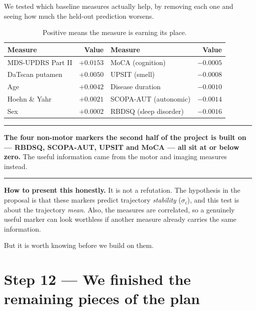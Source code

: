 \documentclass[11pt,a4paper]{article}
\newenvironment{found}
  {\begin{center}\begin{minipage}{0.95\textwidth}%
   \vspace{4pt}\hrule\vspace{6pt}\small}
  {\vspace{6pt}\hrule\vspace{4pt}\end{minipage}\end{center}}
\begin{document}
We tested which baseline measures actually help, by removing each one and seeing
how much the held-out prediction worsens.

\begin{table}[H]
\centering
\small
\begin{tabular}{@{}lr|lr@{}}
\toprule
\textbf{Measure} & \textbf{Value} & \textbf{Measure} & \textbf{Value} \\
\midrule
MDS-UPDRS Part II & $+0.0153$ & MoCA (cognition) & $-0.0005$ \\
DaTscan putamen   & $+0.0050$ & UPSIT (smell)    & $-0.0008$ \\
Age               & $+0.0042$ & Disease duration & $-0.0010$ \\
Hoehn \& Yahr     & $+0.0021$ & SCOPA-AUT (autonomic) & $-0.0014$ \\
Sex               & $+0.0002$ & RBDSQ (sleep disorder) & $-0.0016$ \\
\bottomrule
\end{tabular}
\caption{Positive means the measure is earning its place.}
\end{table}

\begin{found}
\textbf{The four non-motor markers the second half of the project is built on
--- RBDSQ, SCOPA-AUT, UPSIT and MoCA --- all sit at or below zero.} The useful
information came from the motor and imaging measures instead.
\end{found}

\textbf{How to present this honestly.} It is not a refutation. The hypothesis in
the proposal is that these markers predict trajectory \emph{stability}
($\sigma_i$), and this test is about the trajectory \emph{mean}. Also, the
measures are correlated, so a genuinely useful marker can look worthless if
another measure already carries the same information.

But it is worth knowing before we build on them.

\section{Step 12 --- We finished the remaining pieces of the plan}
\end{document}
